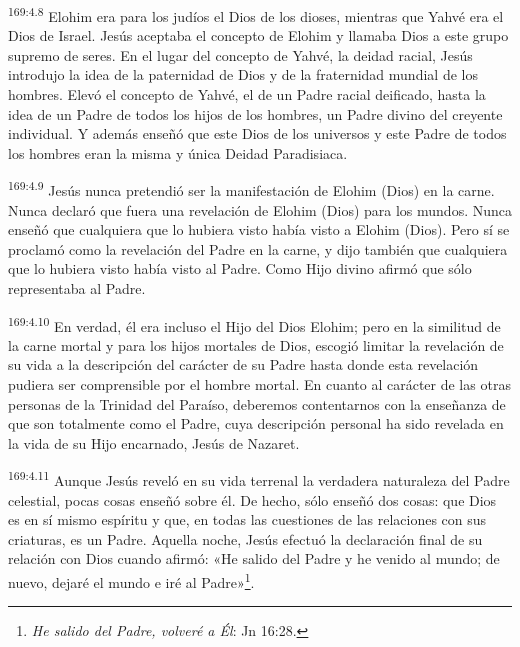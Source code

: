 \par 
\textsuperscript{169:4.8} Elohim era para los judíos el Dios de los dioses, mientras que Yahvé era el Dios de Israel. Jesús aceptaba el concepto de Elohim y llamaba Dios a este grupo supremo de seres. En el lugar del concepto de Yahvé, la deidad racial, Jesús introdujo la idea de la paternidad de Dios y de la fraternidad mundial de los hombres. Elevó el concepto de Yahvé, el de un Padre racial deificado, hasta la idea de un Padre de todos los hijos de los hombres, un Padre divino del creyente individual. Y además enseñó que este Dios de los universos y este Padre de todos los hombres eran la misma y única Deidad Paradisiaca.

\par 
\textsuperscript{169:4.9} Jesús nunca pretendió ser la manifestación de Elohim (Dios) en la carne. Nunca declaró que fuera una revelación de Elohim (Dios) para los mundos. Nunca enseñó que cualquiera que lo hubiera visto había visto a Elohim (Dios). Pero sí se proclamó como la revelación del Padre en la carne, y dijo también que cualquiera que lo hubiera visto había visto al Padre. Como Hijo divino afirmó que sólo representaba al Padre.

\par 
\textsuperscript{169:4.10} En verdad, él era incluso el Hijo del Dios Elohim; pero en la similitud de la carne mortal y para los hijos mortales de Dios, escogió limitar la revelación de su vida a la descripción del carácter de su Padre hasta donde esta revelación pudiera ser comprensible por el hombre mortal. En cuanto al carácter de las otras personas de la Trinidad del Paraíso, deberemos contentarnos con la enseñanza de que son totalmente como el Padre, cuya descripción personal ha sido revelada en la vida de su Hijo encarnado, Jesús de Nazaret.

\par 
\textsuperscript{169:4.11} Aunque Jesús reveló en su vida terrenal la verdadera naturaleza del Padre celestial, pocas cosas enseñó sobre él. De hecho, sólo enseñó dos cosas: que Dios es en sí mismo espíritu y que, en todas las cuestiones de las relaciones con sus criaturas, es un Padre. Aquella noche, Jesús efectuó la declaración final de su relación con Dios cuando afirmó: «He salido del Padre y he venido al mundo; de nuevo, dejaré el mundo e iré al Padre»\footnote{\textit{He salido del Padre, volveré a Él}: Jn 16:28.}.

